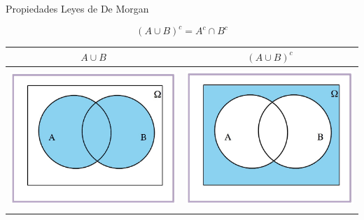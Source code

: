 \documentclass[
  ignorenonframetext,
]{beamer}
\begin{document}
\begin{frame}{Propiedades}
\protect\hypertarget{propiedades-4}{}
Leyes de De Morgan

\[(A\cup B)^c=A^c\cap B^c\]

\begin{longtable}[]{@{}cc@{}}
\toprule
\(A\cup B\) & \((A\cup B)^c\) \\
\midrule
\endhead
\includegraphics[width=\textwidth,height=2.08333in]{Images/proba1dibujos/demorgan6.jpg}
&
\includegraphics[width=\textwidth,height=2.08333in]{Images/proba1dibujos/demorgan7.jpg} \\
\bottomrule
\end{longtable}
\end{frame}
\end{document}
